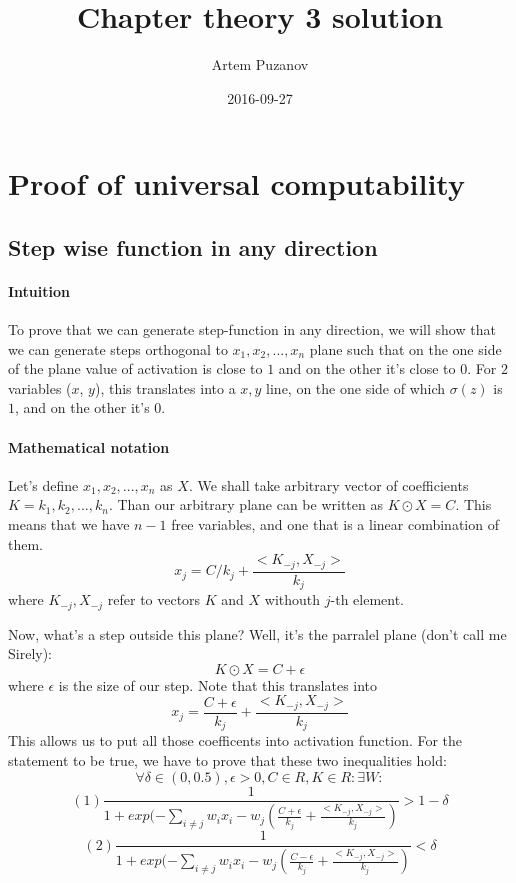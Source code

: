 \documentclass{article}
\title{Chapter theory 3 solution}
\date{2016-09-27}
\author{Artem Puzanov}
\begin{document}
\maketitle
{}
\newpage
{}


\section{Proof of universal computability}
\subsection{Step wise function in any direction}

\paragraph{Intuition}
To prove that we can generate step-function in any direction, we will show that we can
generate steps orthogonal to ${x_1, x_2, ..., x_n}$ plane such that on the one side of the plane value of activation is close to $1$
and on the other it's close to $0$. For $2$ variables ($x$, $y$), this translates into a ${x, y}$ line, on the one side of which $\sigma(z)$
is $1$, and on the other it's $0$.
\paragraph{Mathematical notation}
Let's define ${x_1, x_2, ..., x_n}$ as $X$. We shall take arbitrary vector of coefficients $K = {k_1, k_2, ..., k_n}$.
Than our arbitrary plane can be written as $K \odot X = C$. This means that we have $n-1$ free variables, and one that is a linear combination of them.
$$x_j = C/k_j + \frac{<K_{-j} , X_{-j}>}{k_j}$$
where $K_{-j} , X_{-j}$ refer to vectors $K$ and $X$ withouth $j$-th element.

Now, what's a step outside this plane?
Well, it's the parralel plane (don't call me Sirely):
$$K \odot X = C + \epsilon$$
where $\epsilon$ is the size of our step.
Note that this translates into
$$x_j = \frac{C + \epsilon}{k_j} + \frac{<K_{-j} , X_{-j}>}{k_j}$$
This allows us to put all those coefficents into activation function.
For the statement to be true, we have to prove that these two inequalities hold:
$$\forall \delta \in (0, 0.5), \epsilon > 0 , C \in R,  K \in R: \exists W:$$
$$(1) \frac{1}{1 + exp(- \sum_{i \neq j}w_ix_i - w_j (\frac{C + \epsilon}{k_j} + \frac{<K_{-j} , X_{-j}>}{k_j})} > 1-\delta$$
$$(2) \frac{1}{1 + exp(- \sum_{i \neq j}w_ix_i - w_j (\frac{C - \epsilon}{k_j} + \frac{<K_{-j} , X_{-j}>}{k_j})} < \delta$$
\end{document}
